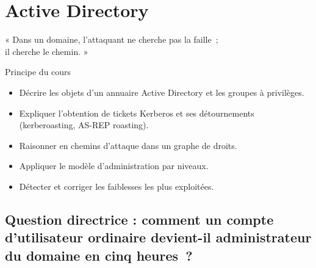 
\chapter{Active Directory}
\label{chap:ad}

\epigraph{%
    « Dans un domaine, l'attaquant ne cherche pas la faille~;\\
    il cherche le chemin. »%
}{Principe du cours}


\begin{boxobjectifs}
\begin{itemize}
    \item Décrire les objets d'un annuaire Active Directory et les groupes à
          privilèges.
    \item Expliquer l'obtention de tickets Kerberos et ses détournements
          (kerberoasting, AS-REP roasting).
    \item Raisonner en chemins d'attaque dans un graphe de droits.
    \item Appliquer le modèle d'administration par niveaux.
    \item Détecter et corriger les faiblesses les plus exploitées.
\end{itemize}
\end{boxobjectifs}

\bigskip

\section*{Question directrice : comment un compte d'utilisateur ordinaire devient-il administrateur du domaine en cinq heures~?}

